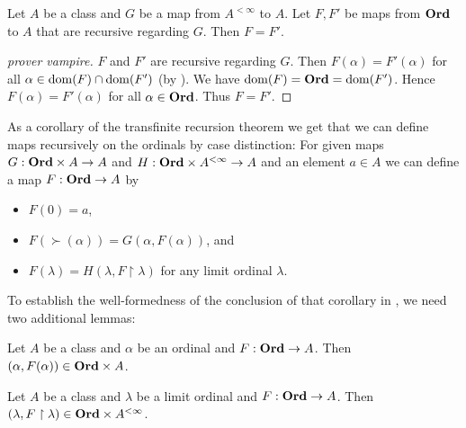 \documentclass{article}
\begin{document}
  \begin{forthel}
    \begin{theorem*}[title=Transfinite Recursion Theorem: Uniqueness,id=recursion_uniqueness]
      Let $A$ be a class and $G$ be a map from $A^{< \infty}$ to $A$.
      Let $F, F'$ be maps from $\textbf{Ord}$ to $A$ that are recursive regarding $G$.
      Then $F = F'$.
    \end{theorem*}
    \begin{proof}
      [prover vampire]
      $F$ and $F'$ are recursive regarding $G$.
      Then $F(\alpha) = F'(\alpha)$ for all $\alpha \in \operatorname{dom}(F) \cap \operatorname{dom}(F')$ (by ).
      We have $\operatorname{dom}(F) = \textbf{Ord} = \operatorname{dom}(F')$.
      Hence $F(\alpha) = F'(\alpha)$ for all $\alpha \in \textbf{Ord}$.
      Thus $F = F'$.
    \end{proof}
  \end{forthel}

  As a corollary of the transfinite recursion theorem we get that we can
  define maps recursively on the ordinals by case distinction:
  For given maps $G : \textbf{Ord} \times A \to A$ and
  $H : \textbf{Ord} \times A^{< \infty} \to A$ and an element $a \in A$ we can define
  a map $F : \textbf{Ord} \to A$ by
  \begin{itemize}
    \item $F(0) = a$,
    \item $F(\succ(\alpha)) = G(\alpha, F(\alpha))$, and
    \item $F(\lambda) = H(\lambda, F \restriction \lambda)$
      for any limit ordinal $\lambda$.
  \end{itemize}

  To establish the well-formedness of the conclusion of that corollary in
  \linebreak
  \Naproche, we need two additional lemmas:

  \begin{forthel}
    \begin{lemma*}
      Let $A$ be a class and $\alpha$ be an ordinal and $F : \textbf{Ord} \to A$.
      Then $(\alpha, F(\alpha)) \in \textbf{Ord} \times A$.
    \end{lemma*}

    \begin{lemma*}
      Let $A$ be a class and $\lambda$ be a limit ordinal and $F : \textbf{Ord} \to A$.
      Then $(\lambda, F \restriction \lambda) \in \textbf{Ord} \times A^{< \infty}$.
    \end{lemma*}
  \end{forthel}
\end{document}
